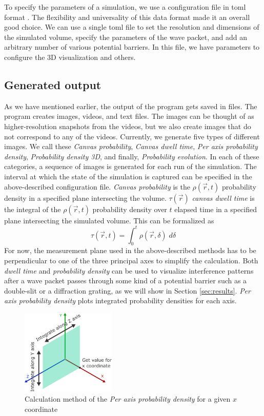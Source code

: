 To specify the parameters of a simulation, we use a configuration file in \acrfull{toml} format \cite{toml}.
The flexibility and universality of this data format made it an overall good choice.
We can use a single \acrshort{toml} file to set the resolution and dimensions of the simulated volume, specify the parameters of the wave packet, and add an arbitrary number of various potential barriers.
In this file, we have parameters to configure the 3D visualization and others.

\subsection{Generated output}

As we have mentioned earlier, the output of the program gets saved in files.
The program creates images, videos, and text files.
The images can be thought of as higher-resolution snapshots from the videos, but we also create images that do not correspond to any of the videos.
Currently, we generate five types of different images.
We call these \textit{Canvas probability}, \textit{Canvas dwell time}, \textit{Per axis probability density}, \textit{Probability density 3D}, and finally, \textit{Probability evolution}.
In each of these categories, a sequence of images is generated for each run of the simulation.
The interval at which the state of the simulation is captured can be specified in the above-described configuration file.
\textit{Canvas probability} is the $\rho(\vec{r}, t)$ probability density in a specified plane intersecting the volume.
$\tau (\vec{r})$ \textit{canvas dwell time} is the integral of the $\rho(\vec{r}, t)$ probability density over $t$ elapsed time in a specified plane intersecting the simulated volume.
This can be formalized as
\begin{equation}
	\tau (\vec{r}, t) = \int_0^t \rho(\vec{r}, \delta)\; d\delta
	\label{eq:dwell_time}
\end{equation}
For now, the measurement plane used in the above-described methods has to be perpendicular to one of the three principal axes to simplify the calculation.
Both \textit{dwell time} and \textit{probability density} can be used to visualize interference patterns after a wave packet passes through some kind of a potential barrier such as a double-slit or a diffraction grating, as we will show in Section \ref{sec:results}.
\textit{Per axis probability density} plots integrated probability densities for each axis.
\begin{figure}[hbt!]
	\centering
	\includegraphics[width=0.4\textwidth]{figures/per_axis_plot_explained.pdf}
	\caption{Calculation method of the \textit{Per axis probability density} for a given $x$ coordinate}
	\label{fig:per_axis_explained}
\end{figure}
